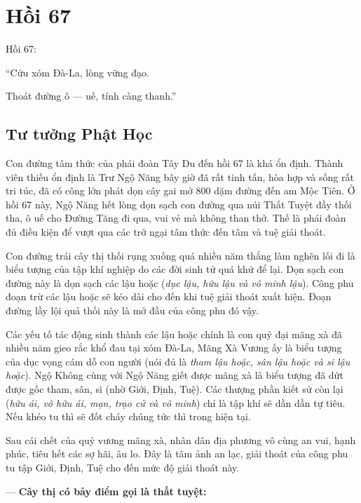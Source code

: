 \chapter{Hồi 67} %
\label{cha:hoi_67}

Hồi 67:

\begin{itshape}
``Cứu xóm Đà-La, lòng vững đạo.

Thoát đường ô --- uế, tính càng thanh.''
\end{itshape}

\section{Tư tưởng Phật Học} %
\label{sec:67_phat_hoc}

Con đường tâm thức của phái đoàn Tây Du đến hồi 67 là khá ổn định. Thành viên thiếu ổn định là Trư Ngộ Năng bây giờ đã rất tinh tấn, hòa hợp và sống rất tri túc, đã có công lớn phát dọn cây gai mở 800 dặm đường đến am Mộc Tiên. Ở hồi 67 này, Ngộ Năng hết lòng dọn sạch con đường qua núi Thất Tuyệt đầy thối tha, ô uế cho Đường Tăng đi qua, vui vẻ mà không than thở. Thế là phái đoàn đủ điều kiện để vượt qua các trở ngại tâm thức đến tâm và tuệ giải thoát.

Con đường trái cây thị thối rụng xuống quá nhiều năm thắng làm nghẽn lối đi là biểu tượng của tập khí nghiệp do các đời sinh tử quá khứ để lại. Dọn sạch con đường này là dọn sạch các lậu hoặc (\emph{dục lậu, hữu lậu và vô minh lậu}). Công phu đoạn trừ các lậu hoặc sẽ kéo dài cho đến khi tuệ giải thoát xuất hiện. Đoạn đường lầy lội quả thối này là mở đầu của công phu đó vậy.

Các yếu tố tác động sinh thành các lậu hoặc chính là con quỷ đại mãng xà đã nhiều năm gieo rắc khổ đau tại xóm Đà-La, Mãng Xà Vương ấy là biểu tượng của dục vọng cám dỗ con người (nói đủ là \emph{tham lậu hoặc, sân lậu hoặc và si lậu hoặc}). Ngộ Không cùng với Ngộ Năng giết được mãng xà là biểu tượng đã dứt được gốc tham, sân, si (nhờ Giới, Định, Tuệ). Các thượng phần kiết sử còn lại (\emph{hữu ái, vô hữu ái, mạn, trạo cử và vô minh}) chỉ là tập khí sẽ dần dần tự tiêu. Nếu khéo tu thì sẽ đốt cháy chúng tức thì trong hiện tại.

Sau cái chết của quỷ vương mãng xà, nhân dân địa phương vô cùng an vui, hạnh phúc, tiêu hết các sợ hãi, âu lo. Đây là tâm ảnh an lạc, giải thoát của công phu tu tập Giới, Định, Tuệ cho đến mức độ giải thoát này.

--- {\bf Cây thị có bảy điểm gọi là thất tuyệt:}

